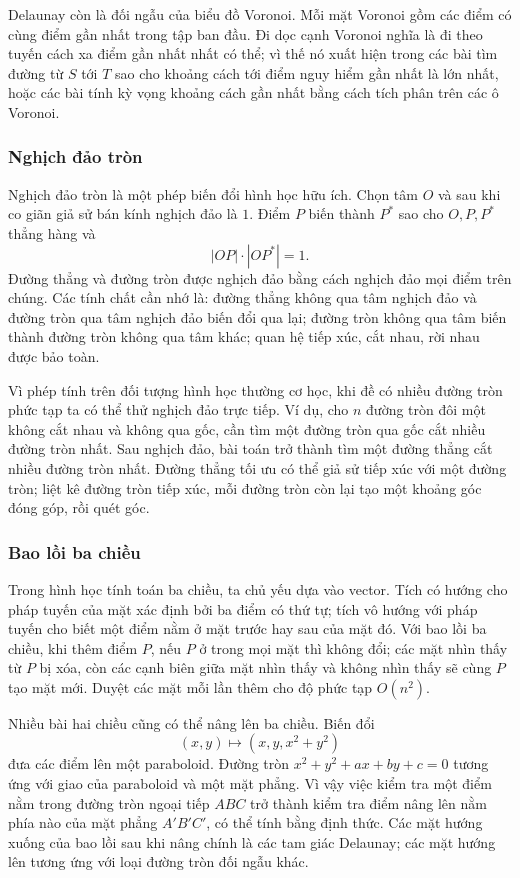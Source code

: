 \documentclass[11pt]{article}
\begin{document}
Delaunay còn là đối ngẫu của biểu đồ Voronoi. Mỗi mặt Voronoi gồm các điểm có
cùng điểm gần nhất trong tập ban đầu. Đi dọc cạnh Voronoi nghĩa là đi theo
tuyến cách xa điểm gần nhất nhất có thể; vì thế nó xuất hiện trong các bài tìm
đường từ $S$ tới $T$ sao cho khoảng cách tới điểm nguy hiểm gần nhất là lớn
nhất, hoặc các bài tính kỳ vọng khoảng cách gần nhất bằng cách tích phân trên
các ô Voronoi.

\subsubsection{Nghịch đảo tròn}

Nghịch đảo tròn là một phép biến đổi hình học hữu ích. Chọn tâm $O$ và sau khi
co giãn giả sử bán kính nghịch đảo là $1$. Điểm $P$ biến thành $P^*$ sao cho
$O,P,P^*$ thẳng hàng và
\[
  |OP|\cdot |OP^*|=1.
\]
Đường thẳng và đường tròn được nghịch đảo bằng cách nghịch đảo mọi điểm trên
chúng. Các tính chất cần nhớ là: đường thẳng không qua tâm nghịch đảo và đường
tròn qua tâm nghịch đảo biến đổi qua lại; đường tròn không qua tâm biến thành
đường tròn không qua tâm khác; quan hệ tiếp xúc, cắt nhau, rời nhau được bảo
toàn.

Vì phép tính trên đối tượng hình học thường cơ học, khi đề có nhiều đường tròn
phức tạp ta có thể thử nghịch đảo trực tiếp. Ví dụ, cho $n$ đường tròn đôi một
không cắt nhau và không qua gốc, cần tìm một đường tròn qua gốc cắt nhiều đường
tròn nhất. Sau nghịch đảo, bài toán trở thành tìm một đường thẳng cắt nhiều
đường tròn nhất. Đường thẳng tối ưu có thể giả sử tiếp xúc với một đường tròn;
liệt kê đường tròn tiếp xúc, mỗi đường tròn còn lại tạo một khoảng góc đóng
góp, rồi quét góc.

\subsubsection{Bao lồi ba chiều}

Trong hình học tính toán ba chiều, ta chủ yếu dựa vào vector. Tích có hướng cho
pháp tuyến của mặt xác định bởi ba điểm có thứ tự; tích vô hướng với pháp tuyến
cho biết một điểm nằm ở mặt trước hay sau của mặt đó. Với bao lồi ba chiều, khi
thêm điểm $P$, nếu $P$ ở trong mọi mặt thì không đổi; các mặt nhìn thấy từ $P$
bị xóa, còn các cạnh biên giữa mặt nhìn thấy và không nhìn thấy sẽ cùng $P$ tạo
mặt mới. Duyệt các mặt mỗi lần thêm cho độ phức tạp $O(n^2)$.

Nhiều bài hai chiều cũng có thể nâng lên ba chiều. Biến đổi
\[
  (x,y)\mapsto (x,y,x^2+y^2)
\]
đưa các điểm lên một paraboloid. Đường tròn
$x^2+y^2+ax+by+c=0$ tương ứng với giao của paraboloid và một mặt phẳng. Vì vậy
việc kiểm tra một điểm nằm trong đường tròn ngoại tiếp $ABC$ trở thành kiểm tra
điểm nâng lên nằm phía nào của mặt phẳng $A'B'C'$, có thể tính bằng định thức.
Các mặt hướng xuống của bao lồi sau khi nâng chính là các tam giác Delaunay;
các mặt hướng lên tương ứng với loại đường tròn đối ngẫu khác.
\end{document}
